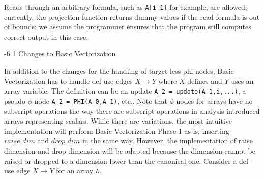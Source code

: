 \documentclass[sigconf, screen, natbib=false, dvipsnames, table]{acmart}
\makeatletter
\renewcommand{\subsubsection}{\@startsection{subsubsection}{3}{\z@}%
                        {-6\p@ \@plus -4\p@ \@minus -4\p@}%
                        {1\p@ \@plus 1\p@ \@minus 0\p@}%
                        {\normalfont\normalsize\bfseries\boldmath}}
\theoremstyle{definition}
\makeatother
\begin{document}
Reads through an arbitrary formula, such as \texttt{A[i-1]} for example, are allowed; currently, the projection function returns dummy values if the read formula is out of bounds; we assume the programmer ensures that the program still computes correct output in this case.

\subsubsection{Changes to Basic Vectorization}

In addition to the changes for the handling of target-less phi-nodes, Basic Vectorization has to handle def-use edges $X \rightarrow Y$ where $X$ defines and $Y$ uses an array variable. The definition can be an update \texttt{A\_2 = update(A\_1,i,...)}, a pseudo $\phi$-node \texttt{A\_2 = PHI(A\_0,A\_1)}, etc.. Note that $\phi$-nodes for arrays have no subscript operations the way there are subscript operations in analysis-introduced arrays representing scalars. While there are variations, the most intuitive implementation will perform Basic Vectorization Phase 1 as is, inserting 
$\mathit{raise\_dim}$ and $\mathit{drop\_dim}$ in the same way. However, the implementation of raise dimension and drop dimension will be adapted because the dimension cannot be raised or dropped to a dimension lower than the canonical one. Consider a def-use edge $X \rightarrow Y$ for an array $\texttt{A}$.
\end{document}
